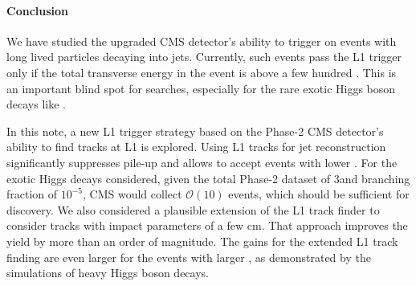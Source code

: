 \paragraph{Conclusion}

We have studied the upgraded CMS detector's ability to trigger on events with long lived particles decaying into jets.
Currently, such events pass the L1 trigger only if the total transverse energy in the event is above a few hundred \UGeV.
This is an important blind spot for searches, especially for the rare exotic Higgs boson decays like
 \Hphiphi.

In this note, a new L1 trigger strategy based on the Phase-2 CMS detector's ability to find tracks at L1 is explored.
Using L1 tracks for jet reconstruction significantly suppresses pile-up and allows to accept events with lower \HT.
For the exotic Higgs decays considered, given the total Phase-2 dataset of 3\abinv and branching fraction of $10^{-5}$, 
CMS would collect $\mathcal{O}(10)$ events, which should be sufficient for discovery.
We also considered a plausible extension of the L1 track finder to consider tracks with impact parameters of a few cm.
That approach improves the yield by more than an order of magnitude. The gains for the extended L1 track finding
are even larger for the events with larger \HT, as demonstrated by the simulations of heavy Higgs boson decays.

